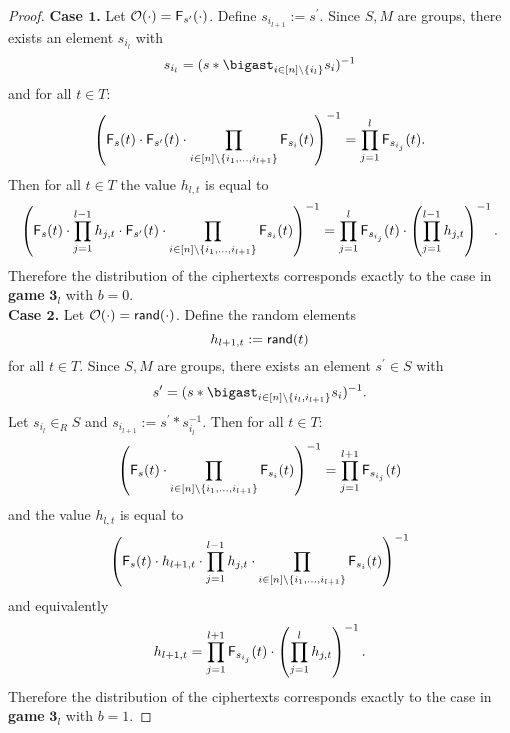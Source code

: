 \documentclass[10pt]{extarticle}
\begin{document}
\begin{proof}
\noindent\textbf{Case $\boldsymbol 1$.} Let $\mathcal{O}(\cdot)=\text{\upshape\sffamily F}_{s^\prime}(\cdot)$. Define $s_{i_{l+1}}:=s^\prime$. Since $S,M$ are groups, there exists an element $s_{i_l}$ with 
\[s_{i_l}=(s\ast\bigast_{i\in[n]\setminus\{i_l\}} s_i)^{-1}\]
and for all $t\in T$:
\[\left(\text{\upshape\sffamily F}_s(t)\cdot \text{\upshape\sffamily F}_{s^\prime}(t)\cdot\prod_{i\in[n]\setminus\{i_1,\ldots,i_{l+1}\}} \text{\upshape\sffamily F}_{s_i}(t)\right)^{-1} = \prod_{j=1}^l \text{\upshape\sffamily F}_{s_{i_j}}(t).\]
Then for all $t\in T$ the value $h_{l,t}$ is equal to
\[\left(\text{\upshape\sffamily F}_s(t)\cdot\prod_{j=1}^{l-1}h_{j,t}\cdot \text{\upshape\sffamily F}_{s^\prime}(t)\cdot\prod_{i\in[n]\setminus\{i_1,\ldots,i_{l+1}\}} \text{\upshape\sffamily F}_{s_i}(t)\right)^{-1}=\prod_{j=1}^l \text{\upshape\sffamily F}_{s_{i_j}}(t)\cdot\left(\prod_{j=1}^{l-1}h_{j,t}\right)^{-1}.\]
Therefore the distribution of the ciphertexts corresponds exactly to the case in \textbf{game} $\boldsymbol 3_l$ with $b=0$.\\

\noindent\textbf{Case $\boldsymbol 2$.} Let $\mathcal{O}(\cdot)=\mbox{\upshape\sffamily rand}(\cdot)$. Define the random elements 
\[h_{l+1,t}:=\mbox{\upshape\sffamily rand}(t)\] 
for all $t\in T$. Since $S,M$ are groups, there exists an element $s^\prime\in S$ with 
\[s^\prime=(s\ast\bigast_{i\in[n]\setminus\{i_l,i_{l+1}\}} s_i)^{-1}.\] 
Let $s_{i_l}\in_R S$ and $s_{i_{l+1}}:=s^\prime * s_{i_l}^{-1}$. Then for all $t\in T$:
\[\left(\text{\upshape\sffamily F}_s(t)\cdot\prod_{i\in[n]\setminus\{i_1,\ldots,i_{l+1}\}} \text{\upshape\sffamily F}_{s_i}(t)\right)^{-1} = \prod_{j=1}^{l+1} \text{\upshape\sffamily F}_{s_{i_j}}(t)\] 
and the value $h_{l,t}$ is equal to
\[\left(\text{\upshape\sffamily F}_s(t)\cdot h_{l+1,t}\cdot\prod_{j=1}^{l-1}h_{j,t}\cdot\prod_{i\in[n]\setminus\{i_1,\ldots,i_{l+1}\}} \text{\upshape\sffamily F}_{s_i}(t)\right)^{-1}\]
and equivalently 
\[h_{l+1,t} = \prod_{j=1}^{l+1} \text{\upshape\sffamily F}_{s_{i_j}}(t)\cdot\left(\prod_{j=1}^{l}h_{j,t}\right)^{-1}.\]
Therefore the distribution of the ciphertexts corresponds exactly to the case in \textbf{game} $\boldsymbol 3_l$ with $b=1$.\par\medskip


\end{proof}
\end{document}
